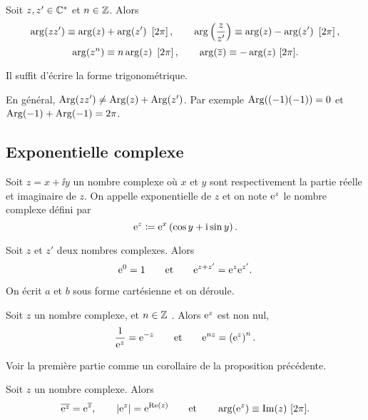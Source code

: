 \documentclass{magnolia}
\begin{document}
\begin{proposition}[utile=-3]
  Soit $z,z'\in\mathbb{C}^*$ et $n\in\mathbb{Z}$. Alors
  \[\arg(z z')\equiv\arg(z)+\arg(z')\ \left[2\pi\right], \qquad
    \arg\left(\frac{z}{z'}\right)\equiv\arg(z)-\arg(z')\ \left[2\pi\right],\]
  \[\arg(z^n)\equiv n\arg(z)\ \left[2\pi\right], \qquad
    \arg(\overline{z})\equiv -\arg(z)\ [2\pi].\]
\end{proposition}

\begin{preuve}
Il suffit d'écrire la forme trigonométrique.
\end{preuve}

\begin{remarqueUnique}
\remarque En général,
  $\operatorname{Arg}(z z')\neq\operatorname{Arg}(z)+\operatorname{Arg}(z')$. Par exemple $\operatorname{Arg}((-1)(-1))=0$ et $\operatorname{Arg}(-1)+\operatorname{Arg}(-1)=2\pi$.
\end{remarqueUnique}

\subsection{Exponentielle complexe}

\begin{definition}[utile=-3]
Soit $z=x+\ii y$ un nombre complexe où $x$ et $y$ sont respectivement la partie
réelle et imaginaire de $z$. On appelle exponentielle de $z$ et on note ${\rm e}^z$
le nombre complexe défini par
\[{\rm e}^z\coloneqq{\rm e}^{x}\left(\cos y +{\rm i} \sin y\right).\]
\end{definition}

\begin{proposition}[utile=-3]
Soit $z$ et $z'$ deux nombres complexes. Alors
\[{\rm e}^{0}=1 \qquad \text{et} \qquad {\rm e}^{z+z'}={\rm e}^{z} {\rm e}^{z'}.\]
\end{proposition}

\begin{preuve}
On écrit $a$ et $b$ sous forme cartésienne et on déroule.
\end{preuve}

\begin{proposition}[utile=-3]
Soit $z$ un nombre complexe, et $n\in\mathbb{Z}$ . Alors ${\rm e}^z$ est non nul,
\[\frac{1}{{\rm e}^z}={\rm e}^{-z} \qquad \text{et} \qquad {\rm e}^{nz}=\left({\rm e}^z\right)^n.\]
\end{proposition}

\begin{preuve}
Voir la première partie comme un corollaire de la proposition précédente. 
\end{preuve}

\begin{proposition}[utile=-3]
Soit $z$ un nombre complexe. Alors
\[\overline{{\rm e}^z}={\rm e}^{\overline{z}}, \qquad  \left|{\rm e}^z\right|={\rm e}^{\mathop{\rm Re}(z)}
\qquad \text{et} \qquad \arg({\rm e}^z)\equiv \mathop{\rm Im}(z)\ [2\pi].\]
\end{proposition}
\end{document}
